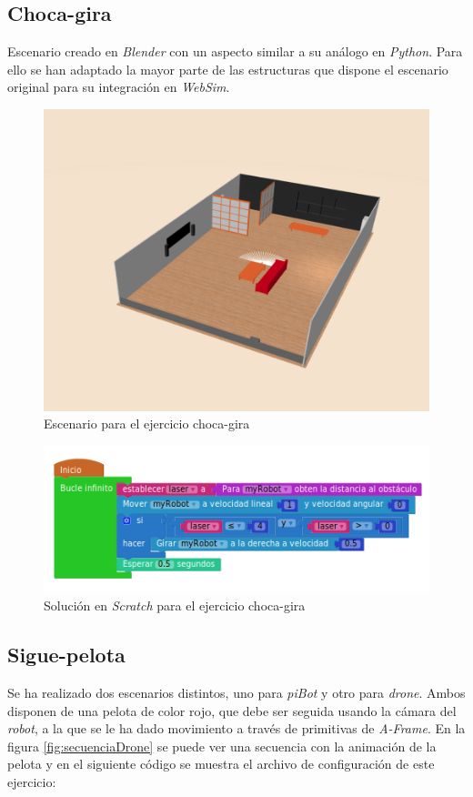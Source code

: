 \subsection{Choca-gira}
\label{subsec:chocagira}
Escenario creado en \textit{Blender} con un aspecto similar a su análogo en \textit{Python}. Para ello se han adaptado la mayor parte de las estructuras que dispone el escenario original para su integración en \textit{WebSim}. 

    \begin{figure}[H]
    \centering
    \includegraphics[scale=0.4]{img/bump&go.png}
    \caption{Escenario para el ejercicio choca-gira} \label{fig:chocagira}
    \end{figure}
    \begin{figure}[H]
    \centering
    \includegraphics[scale=0.5]{img/chocagiracodigo.png}
    \caption{Solución en \textit{Scratch} para el ejercicio choca-gira} 
    \label{fig:chocagiraSolution}
    \end{figure}

\subsection{Sigue-pelota}
\label{subsec:pelota}
Se ha realizado dos escenarios distintos, uno para \textit{piBot} y otro para \textit{drone}.
Ambos disponen de una pelota de color rojo, que debe ser seguida usando la cámara del \textit{robot}, a la que se le ha dado movimiento a través de primitivas de \textit{A-Frame}. En la figura \ref{fig:secuenciaDrone} se puede ver una secuencia con la animación de la pelota y en el siguiente código se muestra el archivo de configuración de este ejercicio:

